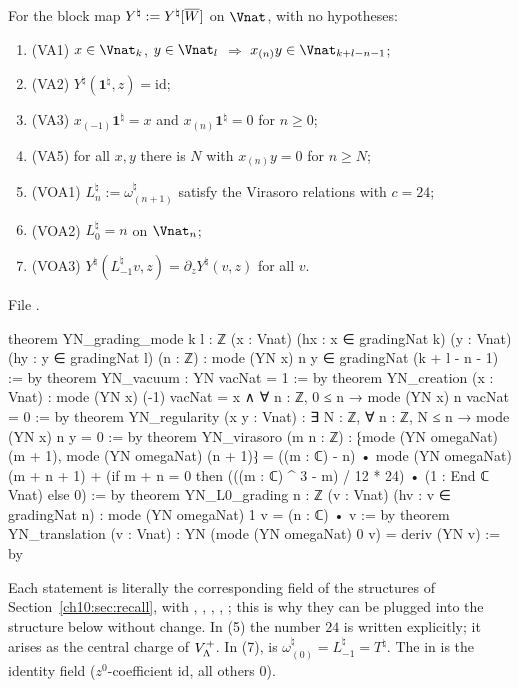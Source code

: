 \begin{theorem}\label{ch10:thm:axioms}
For the block map $Y^\natural:=Y^\natural[\overline{W}]$ on $\Vnat$, with no hypotheses:
\begin{enumerate}[label=(\arabic*)]
\item (VA1) $x\in\Vnat_k$, $y\in\Vnat_l$ $\Rightarrow$ $x_{(n)}y\in\Vnat_{k+l-n-1}$;
\item (VA2) $Y^\natural(\mathbf1^\natural,z)=\mathrm{id}$;
\item (VA3) $x_{(-1)}\mathbf1^\natural=x$ and $x_{(n)}\mathbf1^\natural=0$ for $n\ge0$;
\item (VA5) for all $x,y$ there is $N$ with $x_{(n)}y=0$ for $n\ge N$;
\item (VOA1) $L^\natural_n:=\omega^\natural_{(n+1)}$ satisfy the Virasoro relations with $c=24$;
\item (VOA2) $L^\natural_0=n$ on $\Vnat_n$;
\item (VOA3) $Y^\natural(L^\natural_{-1}v,z)=\partial_zY^\natural(v,z)$ for all $v$.
\end{enumerate}
\end{theorem}
\noindent File .
\begin{leancode}
theorem YN_grading_mode {k l : ℤ} (x : Vnat) (hx : x ∈ gradingNat k) (y : Vnat)
    (hy : y ∈ gradingNat l) (n : ℤ) : mode (YN x) n y ∈ gradingNat (k + l - n - 1) := by
theorem YN_vacuum : YN vacNat = 1 := by
theorem YN_creation (x : Vnat) :
    mode (YN x) (-1) vacNat = x ∧ ∀ n : ℤ, 0 ≤ n → mode (YN x) n vacNat = 0 := by
theorem YN_regularity (x y : Vnat) : ∃ N : ℤ, ∀ n : ℤ, N ≤ n → mode (YN x) n y = 0 := by
theorem YN_virasoro (m n : ℤ) :
    ⁅mode (YN omegaNat) (m + 1), mode (YN omegaNat) (n + 1)⁆
      = ((m : ℂ) - n) • mode (YN omegaNat) (m + n + 1)
        + (if m + n = 0 then (((m : ℂ) ^ 3 - m) / 12 * 24) • (1 : End ℂ Vnat) else 0) := by
theorem YN_L0_grading {n : ℤ} (v : Vnat) (hv : v ∈ gradingNat n) :
    mode (YN omegaNat) 1 v = (n : ℂ) • v := by
theorem YN_translation (v : Vnat) : YN (mode (YN omegaNat) 0 v) = deriv (YN v) := by
\end{leancode}
\begin{dictionary}
Each statement is literally the corresponding field of the structures of
Section~\ref{ch10:sec:recall}, with , ,
, , ; this is
why they can be plugged into the structure below without change.  In (5) the number $24$ is
written explicitly; it arises as the central charge of $V_{\Lambda}^{+}$.  In (7), 
is $\omega^\natural_{(0)}=L^\natural_{-1}=T^\natural$.  The  in  is the
identity field ($z^0$-coefficient $\mathrm{id}$, all others $0$).
\end{dictionary}

